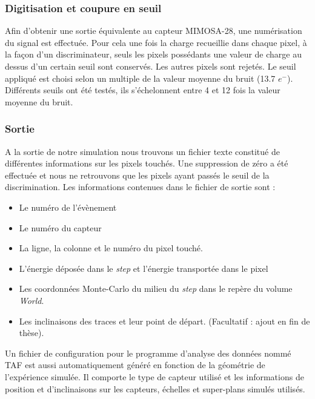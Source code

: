     \subsubsection{Digitisation et coupure en seuil}
   
    Afin d'obtenir une sortie équivalente au capteur MIMOSA-28, une numérisation du signal est effectu\'ee. Pour cela une fois la charge recueillie dans chaque pixel, \`a la façon d'un discriminateur, seuls les pixels possédants une valeur de charge au dessus d'un certain seuil sont conserv\'es. Les autres pixels sont rejet\'es. Le seuil appliqu\'e est choisi selon un multiple de la valeur moyenne du bruit (13.7 $e^-$). Différents seuils ont \'et\'e test\'es, ils s'échelonnent entre 4 et 12 fois la valeur moyenne du bruit. 
    
   
   \subsubsection{Sortie}
   
   A la sortie de notre simulation nous trouvons un fichier texte constitu\'e de diff\'erentes informations sur les pixels touch\'es. Une suppression de z\'ero a \'et\'e effectu\'ee et nous ne retrouvons que les pixels ayant pass\'es le seuil de la discrimination. Les informations contenues dans le fichier de sortie sont :
   
   \medskip
   
   \begin{itemize}
    \item Le num\'ero de l'\'ev\`enement
    \item Le num\'ero du capteur
    \item La ligne, la colonne et le num\'ero du pixel touch\'e.
    \item L'\'energie d\'epos\'ee dans le \textit{step} et l'\'energie transport\'ee dans le pixel
    \item Les coordonn\'ees Monte-Carlo du milieu du \textit{step} dans le rep\`ere du volume \textit{World}.
    \item Les inclinaisons des traces et leur point de d\'epart. (Facultatif : ajout en fin de th\`ese).
   \end{itemize}
   
   \medskip 
   
   Un fichier de configuration pour le programme d'analyse des donn\'ees nomm\'e TAF est aussi automatiquement g\'en\'er\'e en fonction de la g\'eom\'etrie de l'expérience simul\'ee. Il comporte le type de capteur utilis\'e et les informations de position et d'inclinaisons sur les capteurs, \'echelles et super-plans simul\'es utilis\'es.
   
